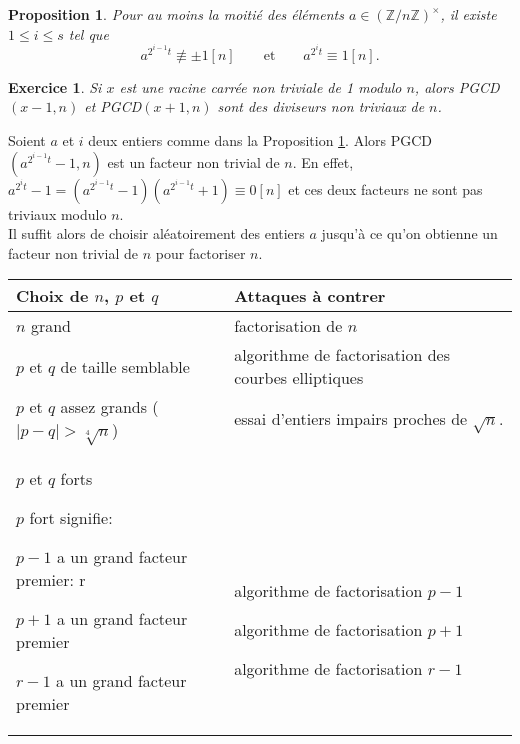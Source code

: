 \documentclass[10pt,a4paper]{report}
\newtheorem*{exo}{Exercice}
\newtheorem{Prop}[thm]{Proposition}
\begin{document}
\begin{Prop}\label{p31}
Pour au moins la moitié des éléments $a \in (\mathbb{Z}/n\mathbb{Z})^{\times}$, il existe $1 \leqslant i \leqslant s  $ tel que
$$   a^{2^{i-1}t}\not \equiv \pm 1 [n] \qquad \text{et} \qquad a^{2^i t}\equiv 1 [n] .       $$
\end{Prop}

\begin{exo}
Si $x$ est une racine carrée non triviale de 1 modulo $n$, alors PGCD$(x-1,n)$ et PGCD$(x+1,n)$ sont des diviseurs non triviaux de $n$.
\end{exo}


Soient $a$ et $i$ deux entiers comme dans la Proposition \ref{p31}. Alors PGCD$(a^{2^{i-1}t}-1,n)$ est un facteur non trivial de $n$. En effet, $ a^{2^i t}-1 =(a^{2^{i-1}t}-1)(a^{2^{i-1}t}+1) \equiv 0 [n]  $ et ces deux facteurs ne sont pas triviaux modulo $n$.\\
Il suffit alors de choisir aléatoirement des entiers $a$ jusqu'à ce qu'on obtienne un facteur non trivial de $n$ pour factoriser $n$.

\bigskip

\begin{tabular}{p{6cm}|p{6cm}}
{Choix de $n$, $p$ et $q$}  & Attaques à contrer \\
\hline 
$n$ grand & factorisation de $n$ \\
\hline
$p$ et $q$ de taille semblable  & algorithme de factorisation des courbes elliptiques \\
\hline
$p$ et $q$ assez grands ($|p-q|> \sqrt[4]{n} $) & essai d'entiers impairs proches de $\sqrt{n}$. \\
\hline
$p$ et $q$ forts

$p$ fort signifie:

$p-1$ a un grand facteur premier: r

$p+1$ a un grand facteur premier

$r-1$ a un grand facteur premier

 & \
 
 \
 
 algorithme de factorisation $p-1$
 
 algorithme de factorisation $p+1$
 
  algorithme de factorisation $r-1$ 
 
 
 \\

\end{tabular}
\end{document}
